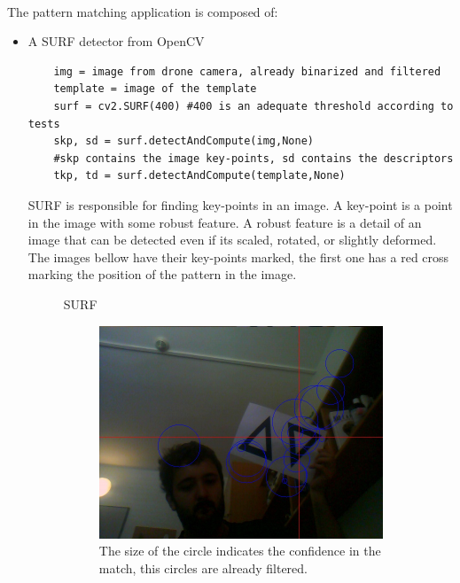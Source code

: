 \documentclass[11pt,twoside,a4paper]{article}
\begin{document}
\paragraph {} The pattern matching application is composed of:
\begin{itemize}
  \item A SURF detector from OpenCV\\
\begin{verbatim}
	img = image from drone camera, already binarized and filtered
	template = image of the template
	surf = cv2.SURF(400) #400 is an adequate threshold according to tests
	skp, sd = surf.detectAndCompute(img,None)
	#skp contains the image key-points, sd contains the descriptors
	tkp, td = surf.detectAndCompute(template,None)
\end{verbatim}
SURF is responsible for finding key-points in an image. A key-point is a point
in the image with some robust feature. A robust feature is a detail of an image
that can be detected even if its scaled, rotated, or slightly deformed.\\
The images bellow have their key-points marked, the first one has a red cross
marking the position of the pattern in the image.
\begin{figure}[hbtp]
  \centering
SURF
\begin{subfigure}{1.00\textwidth}
  \centering
  \includegraphics[width=1.0\linewidth]{image_marked.jpg}
  The size of the circle indicates the confidence in the match, this circles are
already filtered.
\end{subfigure}
\begin{subfigure}{1.00\textwidth}

\end{subfigure}
\end{figure}
\end{itemize}
\end{document}
